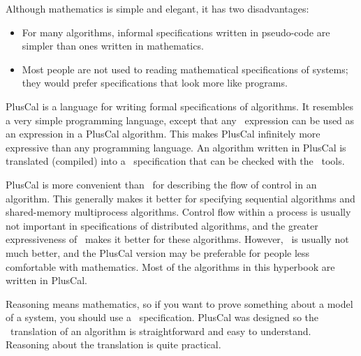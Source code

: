 Although mathematics is simple and elegant, it has two disadvantages:
\begin{itemize}
\item For many algorithms, informal specifications written in
pseudo-code are simpler than ones written in mathematics.

\item Most people are not used to reading mathematical specifications
of systems; they would prefer specifications that look more like
programs.
\end{itemize}
%
PlusCal 
is a language for writing formal specifications of algorithms.
It resembles a very simple programming language, except that any
\tlaplus\ expression can be used as an expression in a PlusCal
algorithm.  This makes PlusCal infinitely more expressive than any
programming language.  An algorithm written in PlusCal is translated
(compiled) into a \tlaplus\ specification that can be checked with the
\tlaplus\ tools.

PlusCal is more convenient than \tlaplus\ for describing the flow of
control in an algorithm.  This generally makes it better for
specifying sequential algorithms and shared-memory multiprocess
algorithms.  Control flow within a process is usually not important in
specifications of distributed algorithms, and the greater
expressiveness of \tlaplus\ makes it better for these algorithms.
However, \tlaplus\ is usually not much better, and the PlusCal version
may be preferable for people less comfortable with mathematics.  
Most of the algorithms in this hyperbook are written in PlusCal.

Reasoning means mathematics, so if you want to prove something about a
model of a system, you should use a \tlaplus\ specification.  PlusCal
was designed so the \tlaplus\ translation of an algorithm is 
straightforward and easy to understand.  Reasoning about the
translation is quite practical.

